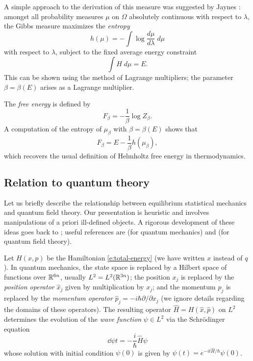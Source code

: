 A simple approach to the derivation of this measure was suggested by Jaynes \cite{Jaynes57}:
amongst all probability measures $\mu$ on $\Omega$ absolutely
continuous with respect to $\lambda$, the Gibbs measure maximizes the \emph{entropy}
\begin{equation}
\label{e:entropy-def}
h(\mu) = -\int \log \frac{d\mu}{d\lambda} \; d\mu
\end{equation}
with respect to $\lambda$, subject to the fixed average energy constraint
\begin{equation}
\int H \; d\mu = E.
\end{equation}
This can be shown using the method of Lagrange multipliers;
the parameter $\beta = \beta(E)$ arises as a Lagrange multiplier.

The \emph{free energy} is defined by
\begin{equation}
F_\beta = -\frac{1}{\beta} \log Z_\beta.
\end{equation}
A computation of the entropy of $\mu_\beta$ with $\beta = \beta(E)$ shows that
\begin{equation}
F_\beta = E - \frac{1}{\beta} h(\mu_\beta),
\end{equation}
which recovers the usual definition of Helmholtz free energy in thermodynamics.

\subsection{Relation to quantum theory}

Let us briefly describe the relationship between equilibrium statistical
mechanics and quantum field theory. Our presentation is heuristic and involves
manipulations of a priori ill-defined objects. A rigorous development of these
ideas goes back to \cite{Syma69,Nelson73,OS73,OS75}; useful references are
\cite{Simon05} (for quantum mechanics) and \cite{GJ87} (for quantum
field theory).

Let $H(x, p)$ be the Hamiltonian \eqref{e:total-energy} (we have written $x$
instead of $q$). In quantum mechanics, the state space is replaced by a Hilbert
space of functions over ${\mathbb R}^{6n}$, usually $L^2 = L^2({\mathbb R}^{3n})$;
the position $x_j$ is replaced by the \emph{position operator} $\hat x_j$ given by
multiplication by $x_j$; and the momentum $p_j$ is replaced by the \emph{momentum
operator} $\hat p_j = -i \hbar \partial/\partial x_j$ (we ignore details regarding
the domains of these operators). The resulting operator $\hat H = H(\hat x, \hat p)$
on $L^2$ determines the evolution of the \emph{wave function} $\psi\in L^2$ via
the Schr\"{o}dinger equation
\begin{equation}
\dd{\psi}{t} = -\frac{i}{\hbar} \hat H \psi
\end{equation}
whose solution with initial condition $\psi(0)$ is given by
$\psi(t) = e^{-it\hat H/\hbar} \psi(0)$.

